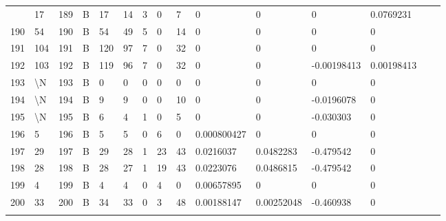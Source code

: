 \begin{longtable}{lllllllllllllll}
\begin{comment}
	189 & 17                & 189 & B   & 17                & 14                & 3                 & 0    & 7          & 0              & 0              & 0             & 0.0769231    \\
	190 & 54                & 190 & B   & 54                & 49                & 5                 & 0    & 14         & 0              & 0              & 0             & 0            \\
	191 & 104               & 191 & B   & 120               & 97                & 7                 & 0    & 32         & 0              & 0              & 0             & 0            \\
	192 & 103               & 192 & B   & 119               & 96                & 7                 & 0    & 32         & 0              & 0              & -0.00198413   & 0.00198413   \\
	193 & \textbackslash{}N & 193 & B   & 0                 & 0                 & 0                 & 0    & 0          & 0              & 0              & 0             & 0            \\
	194 & \textbackslash{}N & 194 & B   & 9                 & 9                 & 0                 & 0    & 10         & 0              & 0              & -0.0196078    & 0            \\
	195 & \textbackslash{}N & 195 & B   & 6                 & 4                 & 1                 & 0    & 5          & 0              & 0              & -0.030303     & 0            \\
	196 & 5                 & 196 & B   & 5                 & 5                 & 0                 & 6    & 0          & 0.000800427    & 0              & 0             & 0            \\
	197 & 29                & 197 & B   & 29                & 28                & 1                 & 23   & 43         & 0.0216037      & 0.0482283      & -0.479542     & 0            \\
	198 & 28                & 198 & B   & 28                & 27                & 1                 & 19   & 43         & 0.0223076      & 0.0486815      & -0.479542     & 0            \\
	199 & 4                 & 199 & B   & 4                 & 4                 & 0                 & 4    & 0          & 0.00657895     & 0              & 0             & 0            \\
	200 & 33                & 200 & B   & 34                & 33                & 0                 & 3    & 48         & 0.00188147     & 0.00252048     & -0.460938     & 0            \\

\end{comment}
\end{longtable}
